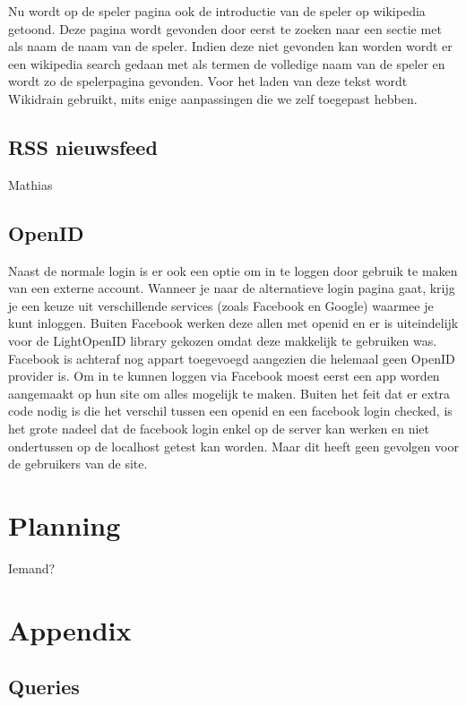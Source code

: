 \documentclass[11pt]{article}
\begin{document}
Nu wordt op de speler pagina ook de introductie van de speler op wikipedia getoond.
Deze pagina wordt gevonden door eerst te zoeken naar een sectie met als naam de naam van de speler.
Indien deze niet gevonden kan worden wordt er een wikipedia search gedaan met als termen de volledige naam van de speler en wordt zo de spelerpagina gevonden.
Voor het laden van deze tekst wordt Wikidrain gebruikt, mits enige aanpassingen die we zelf toegepast hebben.


\subsection{RSS nieuwsfeed}

Mathias



\subsection{OpenID}

Naast de normale login is er ook een optie om in te loggen door gebruik te maken van een externe account. Wanneer je naar de alternatieve login pagina gaat, krijg je een keuze uit verschillende services (zoals Facebook en Google) waarmee je kunt inloggen. Buiten Facebook werken deze allen met openid en er is uiteindelijk voor de LightOpenID library gekozen omdat deze makkelijk te gebruiken was. Facebook is achteraf nog appart toegevoegd aangezien die helemaal geen OpenID provider is. Om in te kunnen loggen via Facebook moest eerst een app worden aangemaakt op hun site om alles mogelijk te maken. Buiten het feit dat er extra code nodig is die het verschil tussen een openid en een facebook login checked, is het grote nadeel dat de facebook login enkel op de server kan werken en niet ondertussen op de localhost getest kan worden. Maar dit heeft geen gevolgen voor de gebruikers van de site.




\section{Planning}


Iemand?



\section{Appendix}

\subsection{Queries}
\end{document}
